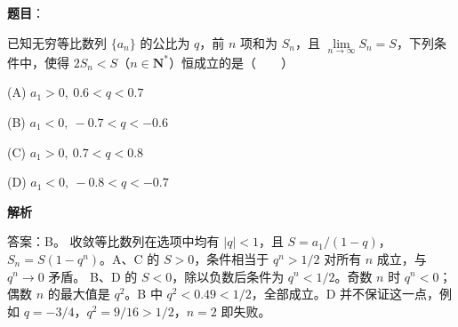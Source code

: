 \begin{answer}

\textbf{题目}：

已知无穷等比数列 \(\{a_n\}\) 的公比为 \(q\)，前 \(n\) 项和为 \(S_n\)，且 \(\lim\limits_{n\to\infty}S_n=S\)，下列条件中，使得 \(2S_n<S\)（\(n\in\mathbf{N}^*\)）恒成立的是\mbox{（　　）}

\noindent(A) \(a_1>0,\ 0.6<q<0.7\)

\noindent(B) \(a_1<0,\ -0.7<q<-0.6\)

\noindent(C) \(a_1>0,\ 0.7<q<0.8\)

\noindent(D) \(a_1<0,\ -0.8<q<-0.7\)

\textbf{解析}

答案：B。
收敛等比数列在选项中均有 \(|q|<1\)，且 \(S=a_1/(1-q)\)，\(S_n=S(1-q^n)\)。A、C 的 \(S>0\)，条件相当于 \(q^n>1/2\) 对所有 \(n\) 成立，与 \(q^n\to0\) 矛盾。
B、D 的 \(S<0\)，除以负数后条件为 \(q^n<1/2\)。奇数 \(n\) 时 \(q^n<0\)；偶数 \(n\) 的最大值是 \(q^2\)。B 中 \(q^2<0.49<1/2\)，全部成立。D 并不保证这一点，例如 \(q=-3/4\)，\(q^2=9/16>1/2\)，\(n=2\) 即失败。


\end{answer}
